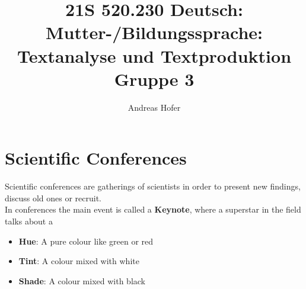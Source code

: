 \documentclass{article}
\title{21S 520.230 Deutsch: Mutter-/Bildungssprache: Textanalyse und Textproduktion Gruppe 3}
\author{Andreas Hofer}
\begin{document}
	\section{Scientific Conferences}
	Scientific conferences are gatherings of scientists in order to present new findings, discuss old ones or recruit. \\
	In conferences the main event is called a \textbf{Keynote}, where a superstar in the field talks about a

	\begin{itemize}
		\item{\textbf{Hue}: A pure colour like green or red }
		\item{\textbf{Tint}: A colour mixed with white }
		\item{\textbf{Shade}: A colour mixed with black }
	\end{itemize}
	
\end{document}
